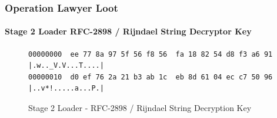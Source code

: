 \documentclass[aspectratio=169]{beamer}
\begin{document}
{
\begin{frame}[fragile]
  \frametitle{Operation Lawyer Loot}
  \framesubtitle{Stage 2 Loader RFC-2898 / Rijndael
    String Decryptor Key}
\begin{figure}
\small{
\begin{verbatim}
00000000  ee 77 8a 97 5f 56 f8 56  fa 18 82 54 d8 f3 a6 91  |.w.._V.V...T....|
00000010  d0 ef 76 2a 21 b3 ab 1c  eb 8d 61 04 ec c7 50 96  |..v*!.....a...P.|
\end{verbatim}
}
\caption{Stage 2 Loader - RFC-2898 / Rijndael String Decryption Key}
\end{figure}
\end{frame}
}
\end{document}
